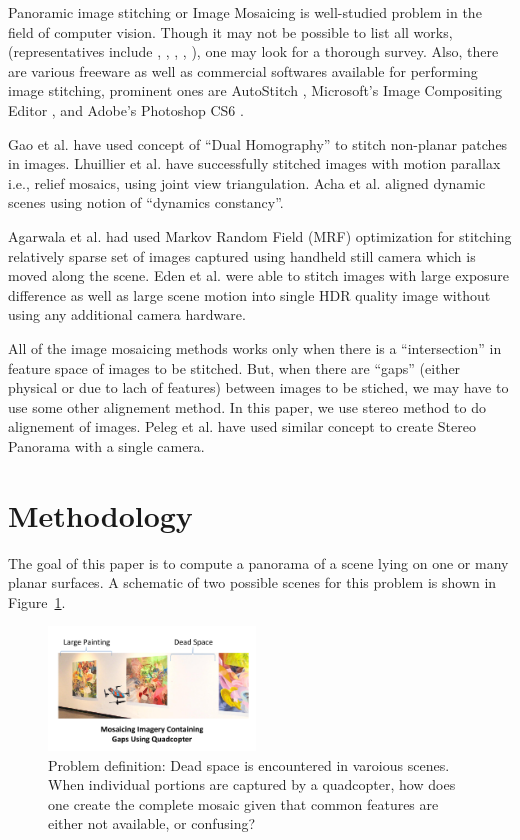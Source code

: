 \documentclass[10pt,twocolumn,letterpaper]{article}
\begin{document}
Panoramic image stitching or Image Mosaicing is well-studied problem in the
field of computer vision. Though it may not be possible to list all works,
(representatives include \cite{Milgram1975}, \cite{Milgram1977}, \cite{Capel},
\cite{Szeliski1997} \cite{Brown}, \cite{Brown07}), one may look
\cite{Szeliski05imagealignment} for a thorough survey.
Also, there are various freeware as well as commercial softwares available  for
performing image stitching, prominent ones are AutoStitch \cite{autostitch},
Microsoft’s Image Compositing Editor \cite{ICE}, and Adobe’s Photoshop CS6 \cite{photoshop}.

Gao et al. \cite{Gao} have used concept of ``Dual Homography'' to stitch
non-planar patches in images. Lhuillier et al.\cite{Lhuillier} have successfully
stitched images with motion parallax i.e., relief mosaics, using joint view triangulation. 
Acha et al. \cite{Acha} aligned dynamic scenes using notion of ``dynamics
constancy''. 

Agarwala et al.\cite{Agarwala2006} had used Markov Random Field (MRF)
optimization for stitching relatively sparse set of images captured using
handheld still camera which is moved along the scene. Eden et al. \cite{Eden}
were able to stitch images with large exposure difference as well as large
scene motion into single HDR quality image without using any additional camera hardware.

All of the image mosaicing methods works only when there is a
``intersection'' in feature space of images to be stitched. But, when there are
``gaps'' (either physical or due to lach of features) between images to be
stiched, we may have to use some other alignement method. In this paper, we use
stereo method to do alignement of images. Peleg et al. \cite{Peleg} have used
similar concept to create Stereo Panorama with a single camera.

\section{Methodology}

The goal of this paper is to compute a panorama of a scene lying on
one or many planar surfaces.  A schematic of two possible scenes for
this problem is shown in Figure~\ref{fig:schematic}.

\begin{figure}[h!]
  \centering
  \includegraphics[width=0.49\textwidth]{figures/indoor}   
  \caption{ \label{fig:schematic} Problem definition: Dead space is
    encountered in varoious scenes.  When individual
    portions are captured by a quadcopter, how does one create the
    complete mosaic given that common features are either not
    available, or confusing?
  }
\end{figure}    
\end{document}
